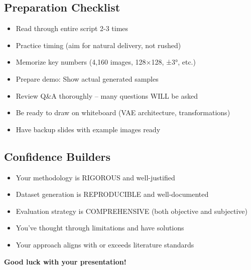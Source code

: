 \documentclass[11pt,a4paper]{article}
\begin{document}
\subsection*{Preparation Checklist}

\begin{itemize}[label=$\square$]
\item Read through entire script 2-3 times
\item Practice timing (aim for natural delivery, not rushed)
\item Memorize key numbers (4,160 images, 128×128, ±3°, etc.)
\item Prepare demo: Show actual generated samples
\item Review Q\&A thoroughly -- many questions WILL be asked
\item Be ready to draw on whiteboard (VAE architecture, transformations)
\item Have backup slides with example images ready
\end{itemize}

\subsection*{Confidence Builders}

\begin{itemize}
\item[\checkmark] Your methodology is RIGOROUS and well-justified
\item[\checkmark] Dataset generation is REPRODUCIBLE and well-documented
\item[\checkmark] Evaluation strategy is COMPREHENSIVE (both objective and subjective)
\item[\checkmark] You've thought through limitations and have solutions
\item[\checkmark] Your approach aligns with or exceeds literature standards
\end{itemize}

\vspace{1cm}
\begin{center}
\textbf{\large Good luck with your presentation!}
\end{center}
\end{document}
